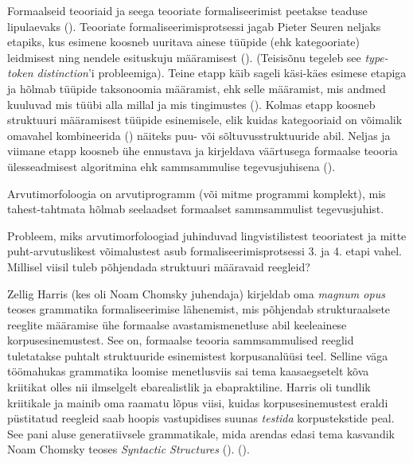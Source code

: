 \documentclass[12pt,a4paper]{article}
\begin{document}
Formaalseid teooriaid ja seega teooriate formaliseerimist peetakse teaduse lipulaevaks (\cite[2026]{auroux_history_2006}). Teooriate formaliseerimis\-protsessi jagab Pieter Seuren neljaks etapiks, kus esimene koosneb uuritava ainese tüüpide (ehk kategooriate) leidmisest ning nendele esitus\-kuju määramisest (\cite[2027]{auroux_history_2006}). (Teisisõnu tegeleb see \textit{type-token distinction}'i probleemiga). Teine etapp käib sageli käsi-käes esimese etapiga ja hõlmab tüüpide taksonoomia määramist, ehk selle määramist, mis andmed kuuluvad mis tüübi alla millal ja mis tingimustes (\cite[2027]{auroux_history_2006}). Kolmas etapp koosneb struktuuri määramisest tüüpide esinemisele, elik kuidas kategooriaid on võimalik omavahel kombineerida (\cite[2027 jj]{auroux_history_2006}) näiteks puu- või sõltuvus\-struktuuride abil. Neljas ja viimane etapp koosneb ühe ennustava ja kirjeldava väärtusega formaalse teooria ülesseadmisest algoritmina ehk sammsammulise tegevusjuhisena (\cite[2031]{auroux_history_2006}).

Arvutimorfoloogia on arvutiprogramm (või mitme programmi komplekt), mis tahest-tahtmata hõlmab seelaadset formaalset sammsammulist tegevusjuhist.

Probleem, miks arvutimorfoloogiad juhinduvad lingvistilistest teooriatest ja mitte puht-arvutuslikest võimalustest asub formaliseerimis\-protsessi 3. ja 4. etapi vahel. Millisel viisil tuleb põhjendada struktuuri määravaid reegleid?

Zellig Harris (kes oli Noam Chomsky juhendaja) kirjeldab oma \textit{magnum opus} teoses grammatika formaliseerimise lähenemist, mis põhjendab strukturaalsete reeglite määramise ühe formaalse avastamis\-menetluse abil keeleainese korpus\-esinemustest. See on, formaalse teooria sammsammulised reeglid tuletatakse puhtalt struktuuride esinemistest korpusanalüüsi teel. Selline väga töömahukas grammatika loomise menetlusviis sai tema kaasaegsetelt kõva kriitikat olles nii ilmselgelt ebarealistlik ja ebapraktiline. Harris oli tundlik kriitikale ja mainib oma raamatu lõpus viisi, kuidas korpus\-esinemustest eraldi püstitatud reegleid saab hoopis vastupidises suunas \textit{testida} korpustekstide peal. See pani aluse generatiivsele grammatikale, mida arendas edasi tema kasvandik Noam Chomsky teoses \textit{Syntactic Structures} (\citeyear{chomsky_syntactic_1957}). (\cite[2031]{auroux_history_2006}).
\end{document}
